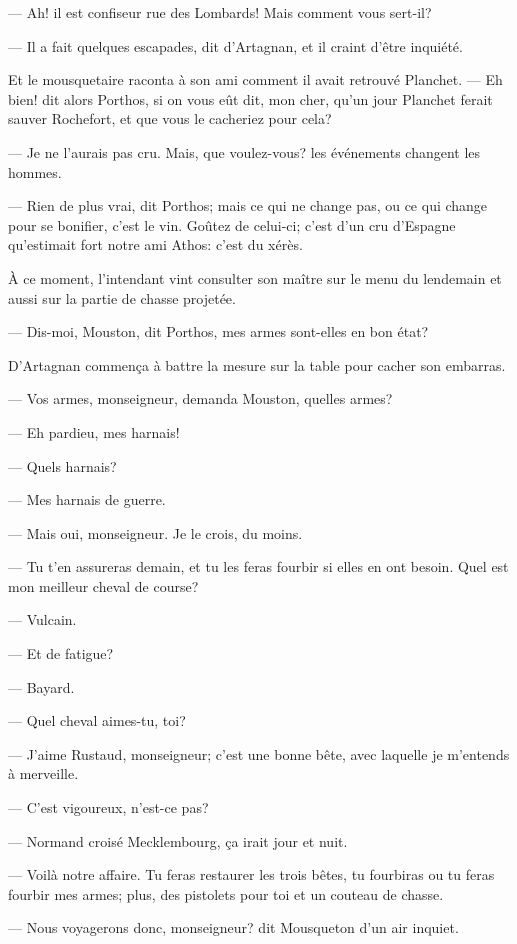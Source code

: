 — Ah! il est confiseur rue des Lombards! Mais comment vous sert-il?

— Il a fait quelques escapades, dit d'Artagnan, et il craint d'être inquiété.

Et le mousquetaire raconta à son ami comment il avait retrouvé Planchet.
— Eh bien! dit alors Porthos, si on vous eût dit, mon cher, qu'un jour Planchet ferait sauver Rochefort, et que vous le cacheriez pour cela?

— Je ne l'aurais pas cru. Mais, que voulez-vous? les événements changent les hommes.

— Rien de plus vrai, dit Porthos; mais ce qui ne change pas, ou ce qui change pour se bonifier, c'est le vin. Goûtez de celui-ci; c'est d'un cru d'Espagne qu'estimait fort notre ami Athos: c'est du xérès.

À ce moment, l'intendant vint consulter son maître sur le menu du lendemain et aussi sur la partie de chasse projetée.

— Dis-moi, Mouston, dit Porthos, mes armes sont-elles en bon état?

D'Artagnan commença à battre la mesure sur la table pour cacher son embarras.

— Vos armes, monseigneur, demanda Mouston, quelles armes?

— Eh pardieu, mes harnais!

— Quels harnais?

— Mes harnais de guerre.

— Mais oui, monseigneur. Je le crois, du moins.

— Tu t'en assureras demain, et tu les feras fourbir si elles en ont besoin. Quel est mon meilleur cheval de course?

— Vulcain.

— Et de fatigue?

— Bayard.

— Quel cheval aimes-tu, toi?

— J'aime Rustaud, monseigneur; c'est une bonne bête, avec laquelle je m'entends à merveille.

— C'est vigoureux, n'est-ce pas?

— Normand croisé Mecklembourg, ça irait jour et nuit.

— Voilà notre affaire. Tu feras restaurer les trois bêtes, tu fourbiras ou tu feras fourbir mes armes; plus, des pistolets pour toi et un couteau de chasse.

— Nous voyagerons donc, monseigneur? dit Mousqueton d'un air inquiet.

